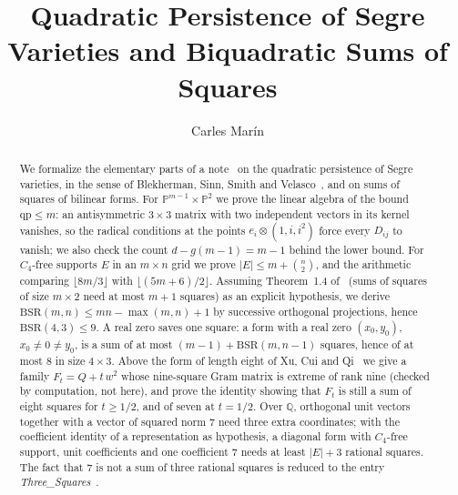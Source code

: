 \documentclass[10pt,a4paper]{article}
\begin{document}
\title{Quadratic Persistence of Segre Varieties and Biquadratic Sums of Squares}
\author{Carles Mar\'in}
\maketitle

\begin{abstract}
We formalize the elementary parts of a note~\cite{Marin2026} on the quadratic persistence of Segre varieties, in the sense of Blekherman, Sinn, Smith and Velasco~\cite{BSSV}, and on sums of squares of bilinear forms. For $\mathbb{P}^{m-1}\times\mathbb{P}^2$ we prove the linear algebra of the bound $\mathrm{qp}\le m$: an antisymmetric $3\times3$ matrix with two independent vectors in its kernel vanishes, so the radical conditions at the points $e_i\otimes(1,i,i^2)$ force every $D_{ij}$ to vanish; we also check the count $d-g(m-1)=m-1$ behind the lower bound. For $C_4$-free supports $E$ in an $m\times n$ grid we prove $|E|\le m+\binom n2$, and the arithmetic comparing $\lfloor 8m/3\rfloor$ with $\lfloor(5m+6)/2\rfloor$. Assuming Theorem~1.4 of~\cite{BSSV} (sums of squares of size $m\times2$ need at most $m+1$ squares) as an explicit hypothesis, we derive $\mathrm{BSR}(m,n)\le mn-\max(m,n)+1$ by successive orthogonal projections, hence $\mathrm{BSR}(4,3)\le9$. A real zero saves one square: a form with a real zero $(x_0,y_0)$, $x_0\ne0\ne y_0$, is a sum of at most $(m-1)+\mathrm{BSR}(m,n-1)$ squares, hence of at most $8$ in size $4\times3$. Above the form of length eight of Xu, Cui and Qi~\cite{XCQ} we give a family $F_t=Q+t\,w^2$ whose nine-square Gram matrix is extreme of rank nine (checked by computation, not here), and prove the identity showing that $F_t$ is still a sum of eight squares for $t\ge1/2$, and of seven at $t=1/2$. Over $\mathbb{Q}$, orthogonal unit vectors together with a vector of squared norm $7$ need three extra coordinates; with the coefficient identity of a representation as hypothesis, a diagonal form with $C_4$-free support, unit coefficients and one coefficient $7$ needs at least $|E|+3$ rational squares. The fact that $7$ is not a sum of three rational squares is reduced to the entry \emph{Three\_Squares}~\cite{Three_Squares-AFP}.
\end{abstract}
\end{document}
